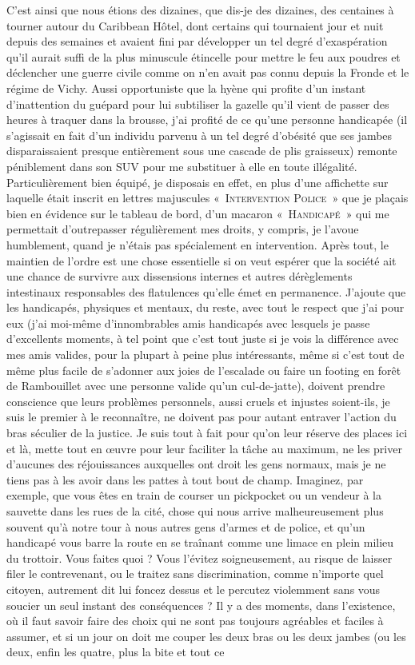C’est ainsi que nous étions des dizaines, que dis-je des dizaines, des centaines à tourner autour du Caribbean Hôtel, dont certains qui tournaient jour et nuit depuis des semaines et avaient fini par développer un tel degré d’exaspération qu’il aurait suffi de la plus minuscule étincelle pour mettre le feu aux poudres et déclencher une guerre civile comme on n’en avait pas connu depuis la Fronde et le régime de Vichy. Aussi opportuniste que la hyène qui profite d’un instant d’inattention du guépard pour lui subtiliser la gazelle qu’il vient de passer des heures à traquer dans la brousse, j’ai profité de ce qu’une personne handicapée (il s’agissait en fait d’un individu parvenu à un tel degré d’obésité que ses jambes disparaissaient presque entièrement sous une cascade de plis graisseux) remonte péniblement dans son SUV pour me substituer à elle en toute illégalité. Particulièrement bien équipé, je disposais en effet, en plus d’une affichette sur laquelle était inscrit en lettres majuscules «~\textsc{Intervention Police}~» que je plaçais bien en évidence sur le tableau de bord, d’un macaron «~\textsc{Handicapé}~» qui me permettait d’outrepasser régulièrement mes droits, y compris, je l’avoue humblement, quand je n’étais pas spécialement en intervention. Après tout, le maintien de l’ordre est une chose essentielle si on veut espérer que la société ait une chance de survivre aux dissensions internes et autres dérèglements intestinaux responsables des flatulences qu’elle émet en permanence. J’ajoute que les handicapés, physiques et mentaux, du reste, avec tout le respect que j’ai pour eux (j’ai moi-même d’innombrables amis handicapés avec lesquels je passe d’excellents moments, à tel point que c’est tout juste si je vois la différence avec mes amis valides, pour la plupart à peine plus intéressants, même si c’est tout de même plus facile de s’adonner aux joies de l’escalade ou faire un footing en forêt de Rambouillet avec une personne valide qu’un cul-de-jatte), doivent prendre conscience que leurs problèmes personnels, aussi cruels et injustes soient-ils, je suis le premier à le reconnaître, ne doivent pas pour autant entraver l’action du bras séculier de la justice. Je suis tout à fait pour qu’on leur réserve des places ici et là, mette tout en œuvre pour leur faciliter la tâche au maximum, ne les priver d’aucunes des réjouissances auxquelles ont droit les gens normaux, mais je ne tiens pas à les avoir dans les pattes à tout bout de champ. Imaginez, par exemple, que vous êtes en train de courser un pickpocket ou un vendeur à la sauvette dans les rues de la cité, chose qui nous arrive malheureusement plus souvent qu’à notre tour à nous autres gens d’armes et de police, et qu’un handicapé vous barre la route en se traînant comme une limace en plein milieu du trottoir. Vous faites quoi ? Vous l’évitez soigneusement, au risque de laisser filer le contrevenant, ou le traitez sans discrimination, comme n’importe quel citoyen, autrement dit lui foncez dessus et le percutez violemment sans vous soucier un seul instant des conséquences ? Il y a des moments, dans l’existence, où il faut savoir faire des choix qui ne sont pas toujours agréables et faciles à assumer, et si un jour on doit me couper les deux bras ou les deux jambes (ou les deux, enfin les quatre, plus la bite et tout ce 